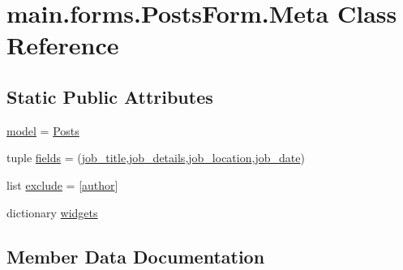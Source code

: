 \hypertarget{classmain_1_1forms_1_1PostsForm_1_1Meta}{}\section{main.\+forms.\+Posts\+Form.\+Meta Class Reference}
\label{classmain_1_1forms_1_1PostsForm_1_1Meta}
\subsection*{Static Public Attributes}
\begin{DoxyCompactItemize}
\item 
\hyperlink{classmain_1_1forms_1_1PostsForm_1_1Meta_a8750381fd161fbe8cd6838ba9fa29a5c}{model} = \hyperlink{classmain_1_1models_1_1Posts}{Posts}
\item 
tuple \hyperlink{classmain_1_1forms_1_1PostsForm_1_1Meta_ac8aaeb182926f5159a7eef5782962a3e}{fields} = (\textquotesingle{}\hyperlink{classmain_1_1forms_1_1PostsForm_a0286cf5ae2c41dfb1dc7b3f9fd46c987}{job\+\_\+title}\textquotesingle{},\textquotesingle{}\hyperlink{classmain_1_1forms_1_1PostsForm_a7e2256c540b49c2134b73f5c50bc64ce}{job\+\_\+details}\textquotesingle{},\textquotesingle{}\hyperlink{classmain_1_1forms_1_1PostsForm_a207de8216238d269e87d2c827c5ddf54}{job\+\_\+location}\textquotesingle{},\textquotesingle{}\hyperlink{classmain_1_1forms_1_1PostsForm_a8eb90d8cc4bf2569e3aaf7e1af9ae724}{job\+\_\+date}\textquotesingle{})
\item 
list \hyperlink{classmain_1_1forms_1_1PostsForm_1_1Meta_ae71f53514fb675086f5bdb0331d19c97}{exclude} = \mbox{[}\textquotesingle{}\hyperlink{classmain_1_1forms_1_1PostsForm_a1e37890650bd078d703943b49ab61390}{author}\textquotesingle{}\mbox{]}
\item 
dictionary \hyperlink{classmain_1_1forms_1_1PostsForm_1_1Meta_ab5ed253773a16d69ea728cfc41e78f89}{widgets}
\end{DoxyCompactItemize}


\subsection{Member Data Documentation}
\mbox{\label{classmain_1_1forms_1_1PostsForm_1_1Meta_ae71f53514fb675086f5bdb0331d19c97}} 
